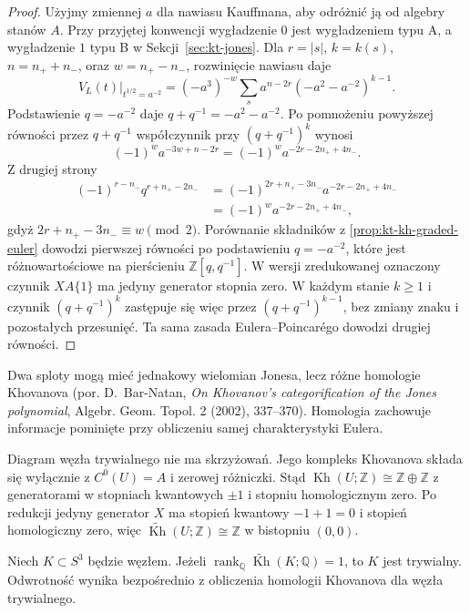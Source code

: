 \begin{proof}
Użyjmy zmiennej $a$ dla nawiasu Kauffmana, aby
odróżnić ją od algebry stanów $A$.
Przy przyjętej konwencji wygładzenie $0$ jest
wygładzeniem typu A, a wygładzenie $1$ typu B
w Sekcji~\ref{sec:kt-jones}.
Dla $r=|s|$, $k=k(s)$, $n=n_++n_-$,
oraz $w=n_+-n_-$, rozwinięcie nawiasu daje
\[
 V_L(t)\big|_{t^{1/2}=a^{-2}}
 =(-a^3)^{-w}
 \sum_s a^{n-2r}(-a^2-a^{-2})^{k-1}.
\]
Podstawienie $q=-a^{-2}$ daje
$q+q^{-1}=-a^2-a^{-2}$.
Po pomnożeniu powyższej równości przez $q+q^{-1}$
współczynnik przy $(q+q^{-1})^k$ wynosi
\[
 (-1)^w a^{-3w+n-2r}
 =(-1)^w a^{-2r-2n_++4n_-}.
\]
Z drugiej strony
\[
 \begin{aligned}
 (-1)^{r-n_-}q^{r+n_+-2n_-}
 &=(-1)^{2r+n_+-3n_-}
   a^{-2r-2n_++4n_-}\\
 &=(-1)^w a^{-2r-2n_++4n_-},
 \end{aligned}
\]
gdyż $2r+n_+-3n_-\equiv w\pmod 2$.
Porównanie składników z
\ref{prop:kt-kh-graded-euler} dowodzi pierwszej
równości po podstawieniu $q=-a^{-2}$, które
jest różnowartościowe na pierścieniu $\mathbb Z[q,q^{-1}]$.
W wersji zredukowanej oznaczony czynnik $XA\{1\}$
ma jedyny generator stopnia zero.
W każdym stanie $k\geq1$ i czynnik
$(q+q^{-1})^k$ zastępuje się więc przez
$(q+q^{-1})^{k-1}$, bez zmiany znaku i pozostałych
przesunięć. Ta sama zasada Eulera--Poincarégo
dowodzi drugiej równości.
\end{proof}

\begin{uwaga}[Kategoryfikacja]

Dwa sploty mogą mieć jednakowy wielomian Jonesa, lecz
różne homologie Khovanova (por. D.~Bar-Natan,
\emph{On Khovanov's categorification of the Jones polynomial},
Algebr. Geom. Topol. 2 (2002), 337--370).
Homologia zachowuje informacje
pominięte przy obliczeniu samej charakterystyki Eulera.
\end{uwaga}

\begin{przyklad}
Diagram węzła trywialnego nie ma skrzyżowań.
Jego kompleks Khovanova składa się wyłącznie z
$C^0(U)=A$ i zerowej różniczki. Stąd
$\operatorname{Kh}(U;\mathbb Z)\cong\mathbb Z\oplus\mathbb Z$
z generatorami w stopniach kwantowych $\pm1$
i stopniu homologicznym zero.
Po redukcji jedyny generator $X$ ma stopień
kwantowy $-1+1=0$ i stopień homologiczny zero,
więc $\widetilde{\operatorname{Kh}}(U;\mathbb Z)
\cong\mathbb Z$ w bistopniu $(0,0)$.
\end{przyklad}

\begin{twierdzenie}
Niech $K\subset S^3$ będzie węzłem. Jeżeli
$\operatorname{rank}_{\mathbb Q}
\widetilde{\operatorname{Kh}}(K;\mathbb Q)=1$,
to $K$ jest trywialny. Odwrotność wynika bezpośrednio
z obliczenia homologii Khovanova dla węzła trywialnego.
\end{twierdzenie}

